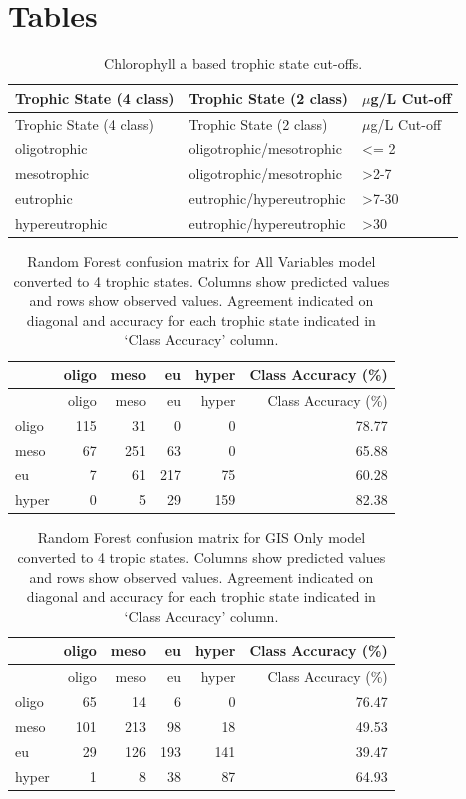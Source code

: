 \documentclass[12pt,]{article}
\begin{document}
\newpage

\newpage

\newpage

\section{Tables}\label{tables}

\begin{longtable}[c]{@{}lll@{}}
\caption{Chlorophyll a based trophic state cut-offs.
\label{tab:trophicStateTable}}\tabularnewline
\toprule
Trophic State (4 class) & Trophic State (2 class) & \(\mu\)g/L
Cut-off\tabularnewline
\midrule
\endfirsthead
\toprule
Trophic State (4 class) & Trophic State (2 class) & \(\mu\)g/L
Cut-off\tabularnewline
\midrule
\endhead
oligotrophic & oligotrophic/mesotrophic & \textless{}= 2\tabularnewline
mesotrophic & oligotrophic/mesotrophic &
\textgreater{}2-7\tabularnewline
eutrophic & eutrophic/hypereutrophic & \textgreater{}7-30\tabularnewline
hypereutrophic & eutrophic/hypereutrophic &
\textgreater{}30\tabularnewline
\bottomrule
\end{longtable}

\newpage

\begin{longtable}[c]{@{}lrrrrr@{}}
\caption{Random Forest confusion matrix for All Variables model
converted to 4 trophic states. Columns show predicted values and rows
show observed values. Agreement indicated on diagonal and accuracy for
each trophic state indicated in `Class Accuracy' column.
\label{tab:Confusion_All_4}}\tabularnewline
\toprule
& oligo & meso & eu & hyper & Class Accuracy (\%)\tabularnewline
\midrule
\endfirsthead
\toprule
& oligo & meso & eu & hyper & Class Accuracy (\%)\tabularnewline
\midrule
\endhead
oligo & 115 & 31 & 0 & 0 & 78.77\tabularnewline
meso & 67 & 251 & 63 & 0 & 65.88\tabularnewline
eu & 7 & 61 & 217 & 75 & 60.28\tabularnewline
hyper & 0 & 5 & 29 & 159 & 82.38\tabularnewline
\bottomrule
\end{longtable}

\newpage

\begin{longtable}[c]{@{}lrrrrr@{}}
\caption{Random Forest confusion matrix for GIS Only model converted to
4 tropic states. Columns show predicted values and rows show observed
values. Agreement indicated on diagonal and accuracy for each trophic
state indicated in `Class Accuracy' column.
\label{tab:Confusion_GIS_4}}\tabularnewline
\toprule
& oligo & meso & eu & hyper & Class Accuracy (\%)\tabularnewline
\midrule
\endfirsthead
\toprule
& oligo & meso & eu & hyper & Class Accuracy (\%)\tabularnewline
\midrule
\endhead
oligo & 65 & 14 & 6 & 0 & 76.47\tabularnewline
meso & 101 & 213 & 98 & 18 & 49.53\tabularnewline
eu & 29 & 126 & 193 & 141 & 39.47\tabularnewline
hyper & 1 & 8 & 38 & 87 & 64.93\tabularnewline
\bottomrule
\end{longtable}
\end{document}
